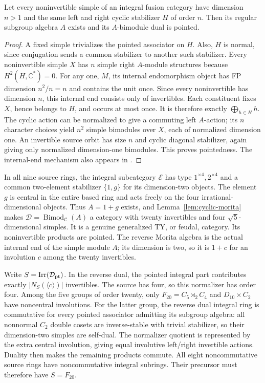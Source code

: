 \documentclass[11pt]{article}
\begin{document}
\begin{lemma}\label{lem:cyclic-morita}
Let every noninvertible simple of an integral fusion category have dimension $n>1$
and the same left and right cyclic stabilizer $H$ of order $n$. Then its regular
subgroup algebra $A$ exists and its $A$-bimodule dual is pointed.
\end{lemma}
\begin{proof}
A fixed simple trivializes the pointed associator on $H$. Also, $H$ is normal,
since conjugation sends a common stabilizer to another such stabilizer.
Every noninvertible simple $X$ has $n$ simple right $A$-module structures because
$H^2(H,\mathbb C^*)=0$. For any one, $M$, its internal endomorphism object has
FP dimension $n^2/n=n$ and contains the unit once. Since every noninvertible has
dimension $n$, this internal end consists only of invertibles. Each constituent
fixes $X$, hence belongs to $H$, and occurs at most once. It is therefore exactly
$\bigoplus_{h\in H}h$. The cyclic action can be normalized to give a commuting
left $A$-action; its $n$ character choices yield $n^2$ simple bimodules over $X$,
each of normalized dimension one. An invertible source orbit has size $n$ and
cyclic diagonal stabilizer, again giving only normalized dimension-one bimodules.
This proves pointedness. The internal-end mechanism also appears in
\cite[Lemmas 6.1--6.2]{EGO}.
\end{proof}

In all nine source rings, the integral subcategory $\mathcal E$ has type
$1^{\times4},2^{\times4}$ and a common two-element stabilizer $\{1,g\}$ for its
dimension-two objects. The element $g$ is central in the entire based ring and
acts freely on the four irrational-dimensional objects. Thus $A=1+g$ exists,
and Lemma~\ref{lem:cyclic-morita} makes
$\mathcal D=\operatorname{Bimod}_{\mathcal C}(A)$ a category with twenty invertibles
and four $\sqrt5$-dimensional simples. It is a genuine generalized TY, or feudal,
category. Its noninvertible products are pointed. The reverse Morita algebra is
the actual internal end of the simple module $A$; its dimension is two, so it is
$1+c$ for an involution $c$ among the twenty invertibles.

Write $S=\operatorname{Irr}(\mathcal D_{\rm pt})$. In the reverse dual, the pointed integral
part contributes exactly $|N_S(\langle c\rangle)|$ invertibles. The source has four,
so this normalizer has order four. Among the five groups of order twenty, only
$F_{20}=C_5\rtimes_2 C_4$ and $D_{10}\times C_2$ have noncentral involutions.
For the latter group, the reverse dual integral ring is commutative for every
pointed associator admitting its subgroup algebra: all nonnormal $C_2$ double
cosets are inverse-stable with trivial stabilizer, so their dimension-two simples
are self-dual. The normalizer quotient is represented by the extra central
involution, giving equal involutive left/right invertible actions. Duality then
makes the remaining products commute. All eight noncommutative source rings have
noncommutative integral subrings. Their precursor must therefore have $S=F_{20}$.
\end{document}

